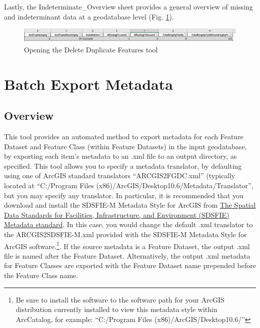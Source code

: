 \documentclass[openany]{book}
\let\rmarkdownfootnote\footnote%
\def\footnote{\protect\rmarkdownfootnote}
\theoremstyle{definition}
\theoremstyle{definition}
\theoremstyle{definition}
\theoremstyle{remark}
\begin{document}
Lastly, the Indeterminate\_Overview sheet provides a general overview of
missing and indeterminant data at a geodatabase level (Fig.
\ref{fig:summIndtsheet4}).

\begin{figure}[H]

{\centering \includegraphics{figures/summIndt-sheet4} 

}

\caption{Opening the Delete Duplicate Features tool}\label{fig:summIndtsheet4}
\end{figure}

\hypertarget{exMeta}{\chapter{Batch Export Metadata}\label{exMeta}}

\section{Overview}\label{overview-10}

This tool provides an automated method to export metadata for each
Feature Dataset and Feature Class (within Feature Datasets) in the input
geodatabase, by exporting each item's metadata to an .xml file to an
output directory, as specified. This tool allows you to specify a
metadata translator, by defaulting using one of ArcGIS standard
translators ``ARCGIS2FGDC.xml'' (typically located at ``C:/Program Files
(x86)/ArcGIS/Desktop10.6/Metadata/Translator'', but you may specify any
translator. In particular, it is recommended that you download and
install the SDSFIE-M Metadata Style for ArcGIS from
\href{https://www.sdsfieonline.org/Standards/Metadata}{The Spatial Data
Standards for Facilities, Infrastructure, and Environment (SDSFIE)
Metadata standard}. In this case, you would change the default .xml
translator to the ARCGIS2SDSFIE-M.xml provided with the SDSFIE-M
Metadata Style for ArcGIS software.\footnote{Be sure to install the
  software to the software path for your ArcGIS distribution currently
  installed to view this metadata style within ArcCatalog, for example:
  ``C:/Program Files (x86)/ArcGIS/Desktop10.6/''}. If the source
metadata is a Feature Dataset, the output .xml file is named after the
Feature Dataset. Alternatively, the output .xml metadata for Feature
Classes are exported with the Feature Dataset name prepended before the
Feature Class name.
\end{document}
